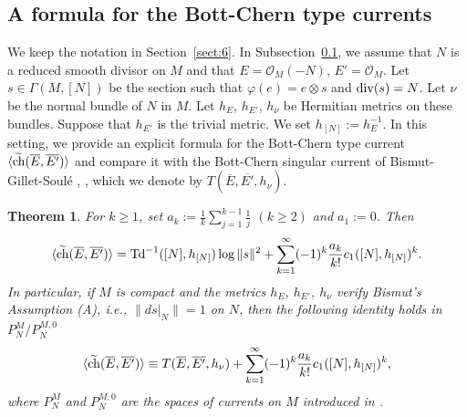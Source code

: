 \documentclass[amscd, leqno]{amsart}
\theoremstyle{plain}
\newtheorem{theorem}{Theorem}[section]
\theoremstyle{definition}
\theoremstyle{remark}
\begin{document}
\subsection
{A formula for the Bott-Chern type currents}
\label{sect:9.3}
\par
We keep the notation in Section~\ref{sect:6}.
In Subsection~\ref{sect:9.3}, we assume that $N$ is a reduced smooth divisor on $M$
and that $E={\mathcal O}_{M}(-N)$, $E'={\mathcal O}_{M}$. 
Let $s \in \Gamma(M, [N])$ be the section such that $\varphi(e) = e\otimes s$ and ${\rm div}(s)=N$.
Let $\nu$ be the normal bundle of $N$ in $M$. Let $h_{E}$, $h_{E'}$, $h_{\nu}$ be Hermitian metrics on these bundles.
Suppose that $h_{E'}$ is the trivial metric. We set $h_{[N]} := h_{E}^{-1}$.
In this setting, we provide an explicit formula for the Bott-Chern type current
$\langle \widetilde{\rm ch}( \overline{E}, \overline{E'} ) \rangle$ and compare it with the Bott-Chern singular current of 
Bismut-Gillet-Soul\'e \cite{BGS90}, \cite{BGS90b}, which we denote by $T( \overline{E}, \overline{E'}, h_{\nu})$. 


\begin{theorem}
\label{thm:comparison:BC}
For $k\geq 1$, set $a_{k} := \frac{1}{k}\sum_{j=1}^{k-1}\frac{1}{j}$ $(k\geq2)$ and $a_{1}:=0$. Then
\begin{equation}
\label{eqn:ch:0}
\langle \widetilde{\rm ch}( \overline{E}, \overline{E'} ) \rangle =  
{\rm Td}^{-1}( [N], h_{[N]} ) \log \| s \|^{2} + \sum_{k=1}^{\infty} (-1)^{k}\frac{a_{k}}{k!} c_{1}( [N], h_{[N]} )^{k}.
\end{equation}
In particular, if $M$ is compact and the metrics $h_{E}$, $h_{E'}$, $h_{\nu}$ verify Bismut's Assumption (A), i.e., 
$\| ds|_{N} \| = 1$ on $N$, then the following identity holds in $P^{M}_{N}/P^{M,0}_{N}$
\begin{equation}
\label{eqn:ch:1}
\langle \widetilde{\rm ch}( \overline{E}, \overline{E'} ) \rangle 
\equiv 
T( \overline{E}, \overline{E'}, h_{\nu} ) + \sum_{k=1}^{\infty} (-1)^{k}\frac{a_{k}}{k!} c_{1}( [N], h_{[N]} )^{k},
\end{equation}
where $P^{M}_{N}$ and $P^{M,0}_{N}$ are the spaces of currents on $M$ introduced in \cite[Def.\,1.3]{BGS90b}.
\end{theorem}
\end{document}
